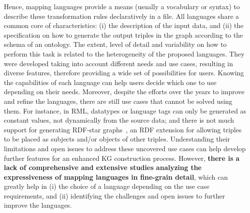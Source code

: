 
 Hence, mapping languages provide a means (usually a vocabulary or syntax) to describe these transformation rules declaratively in a file. 
 All languages share a common core of characteristics: (i) the description of the input data, and (ii) the specification on how to generate the output triples in the graph according to the schema of an ontology. 
 The extent, level of detail and variability on how to perform this task is related to the heterogeneity of the proposed languages. 
 They were developed taking into account different needs and use cases, resulting in diverse features, therefore providing a wide set of possibilities for users.
 Knowing the capabilities of each language can help users decide which one to use depending on their needs. 
 Moreover, despite the efforts over the years to improve and refine the languages, there are still use cases that cannot be solved using them. 
 For instance, in RML, datatypes or language tags can only be generated as constant values, not dynamically from the source data; and there is not much support for generating RDF-star graphs~\parencite{hartig2017foundations}, an RDF extension for allowing triples to be placed as subjects and/or objects of other triples. 
 Understanding their limitations and open issues to address these uncovered use cases can help develop further features for an enhanced KG construction process.
 However, \textbf{there is a lack of comprehensive and extensive studies analyzing the expressiveness of mapping languages in fine-grain detail}, which can greatly help in (i) the choice of a language depending on the use case requirements, and (ii) identifying the challenges and open issues to further improve the languages. 
 


